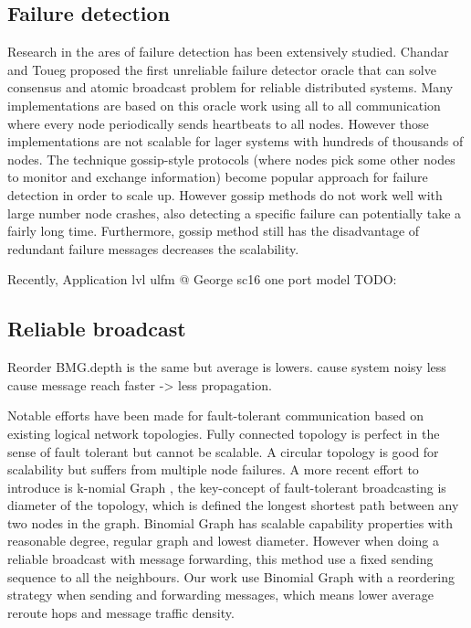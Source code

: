 \documentclass[sigconf]{acmart}
\begin{document}
\subsection{Failure detection}
Research in the ares of failure detection has been extensively studied. Chandar and Toueg\cite{Chandra96} proposed the first unreliable failure detector oracle that can solve consensus and atomic broadcast problem for reliable distributed systems. Many implementations\cite{Wei02}\cite{Larrea00}\cite{Kawazoe97} are based on this oracle work using all to all communication where every node periodically sends heartbeats to all nodes. However those implementations are not scalable for lager systems with hundreds of thousands of nodes. The technique gossip-style protocols\cite{van98} \cite{Ranganathan01}\cite{Gupta01}\cite{Abhinandan02}  (where nodes pick some other nodes to monitor and exchange information) become popular approach for failure detection in order to scale up. However gossip methods do not work well with large number node crashes, also detecting a specific failure can potentially take a fairly long time. Furthermore, gossip method still has the disadvantage of redundant failure messages decreases the scalability.

Recently, Application lvl ulfm @ George sc16 one port model 
TODO:

\subsection{Reliable broadcast}
Reorder BMG.depth is the same but average is lowers. cause system noisy less cause message reach faster -> less propagation.

Notable efforts have been made for fault-tolerant communication based on existing logical network topologies. Fully connected topology is perfect in the sense of fault tolerant but cannot be scalable. A circular topology is good for scalability but suffers from multiple node failures.  
A more recent effort to introduce is k-nomial Graph \cite{Angskun07}\cite{Pava11}, the key-concept of fault-tolerant broadcasting is diameter of the topology, which is defined the longest shortest path between any two nodes in the graph. Binomial Graph has scalable capability properties with reasonable degree, regular graph and lowest diameter. However when doing a reliable broadcast with message forwarding, this method use a fixed sending sequence to all the neighbours. Our work use Binomial Graph with a reordering strategy when sending and forwarding messages, which means lower average reroute hops and message traffic density.
\end{document}
